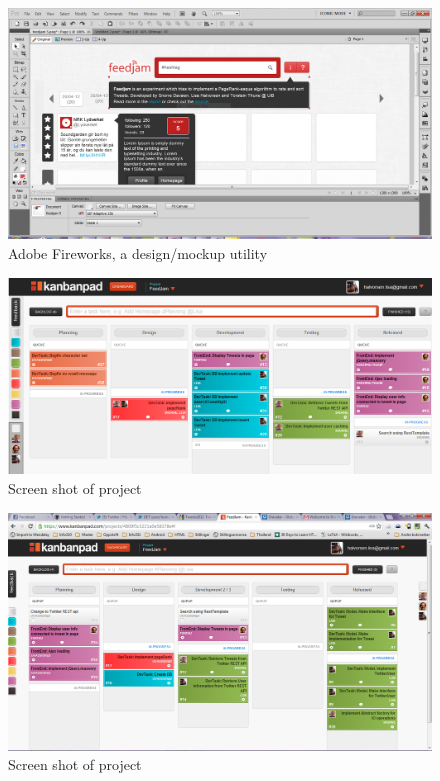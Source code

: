 \begin{figure}[ht]
    \begin{minipage}[b]{1\linewidth}
        \centering
        \includegraphics[width=1\textwidth]{figures/fireworks}
        \caption{Adobe Fireworks, a design/mockup utility}
        \label{fig:fireworks}
    \end{minipage}
\end{figure}

\begin{figure}[ht]
    \begin{minipage}[b]{1\linewidth}
        \centering
        \includegraphics[width=1\textwidth]{figures/130512}
        \caption{Screen shot of project}
        \label{fig:kanbanScreenShot}
    \end{minipage}
\end{figure}

\begin{figure}[ht]
    \begin{minipage}[b]{1\linewidth}
        \centering
        \includegraphics[width=1\textwidth]{figures/08052012}
        \caption{Screen shot of project}
        \label{fig:kanbanScreenShot2}
    \end{minipage}
\end{figure}

